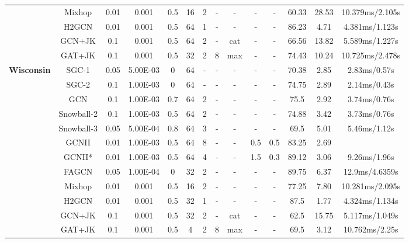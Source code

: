 \documentclass{article}
\newcommand{\0}{{\boldsymbol{0}}}
\newcommand{\6}{{\partial}}
\newcommand{\8}{{\infty}}
\newcommand{\4}{{\nabla}}
\begin{document}
\begin{table}[htbp]
{\begin{tabular}{c|c|cccccccccccc}
          &  Mixhop & 0.01  & 0.001 & 0.5   & 16    & 2     & - & - & -     & -     & 60.33 & 28.53 & {10.379ms/2.105s} \\
          & H2GCN & 0.01  & 0.001 & 0.5   & 64    & 1     & - & - & -     & -     & 86.23 & 4.71  & {4.381ms/1.123s} \\
          & GCN+JK & 0.1   & 0.001 & 0.5   & 64    & 2     & - & {cat} & -     & -     & 66.56 & 13.82 & {5.589ms/1.227s} \\
          &  GAT+JK & 0.1   & 0.001 & 0.5   & 32    & 2     & 8     & {max} & -     & -     & 74.43 & 10.24 & {10.725ms/2.478s} \\
    \midrule
    \multirow{14}[1]{*}{\textbf{Wisconsin}} & SGC-1 & 0.05  & 5.00E-03 & 0     & 64    & -     & -     & -     & -     & -     & 70.38 & 2.85  & 2.83ms/0.57s \\
          & SGC-2 & 0.1   & 1.00E-03 & 0     & 64    & -     & -     & -     & -     & -     & 74.75 & 2.89  & { 2.14ms/0.43s} \\
          & GCN   & 0.1   & 1.00E-03 & 0.7   & 64    & 2     & -     & -     & -     & -     & 75.5  & 2.92  & {3.74ms/0.76s} \\
          & Snowball-2 & 0.1   & 1.00E-03 & 0.5   & 64    & 2     & -     & -     & -     & -     & 74.88 & 3.42  & 3.73ms/0.76s \\
          & Snowball-3 & 0.05  & 5.00E-04 & 0.8   & 64    & 3     & -     & -     & -     & -     & 69.5  & 5.01  & {5.46ms/1.12s} \\
          & GCNII & 0.01  & 1.00E-03 & 0.5   & 64    & 8     & -     & -     & 0.5   & 0.5   & 83.25 & 2.69  &  \\
          & GCNII* & 0.01  & 1.00E-03 & 0.5   & 64    & 4     & -     & -     & 1.5   & 0.3   & 89.12 & 3.06  & 9.26ms/1.96s \\
          & FAGCN & 0.05  & 1.00E-04 & 0     & 32    & 2     & -     & -     & -     & -     & 89.75 & 6.37  & 12.9ms/4.6359s \\
          &  Mixhop & 0.01  & 0.001 & 0.5   & 16    & 2     & - & - & -     & -     & 77.25 & 7.80  & {10.281ms/2.095s} \\
          & H2GCN & 0.01  & 0.001 & 0.5   & 32    & 1     & - & - & -     & -     & 87.5  & 1.77  & {4.324ms/1.134s} \\
          & GCN+JK & 0.1   & 0.001 & 0.5   & 32    & 2     & - & {cat} & -     & -     & 62.5  & 15.75 & {5.117ms/1.049s} \\
          &  GAT+JK & 0.1   & 0.001 & 0.5   & 4     & 2     & 8     & {max} & -     & -     & 69.5  & 3.12  & {10.762ms/2.25s} \\

\end{tabular}}
\end{table}
\end{document}
